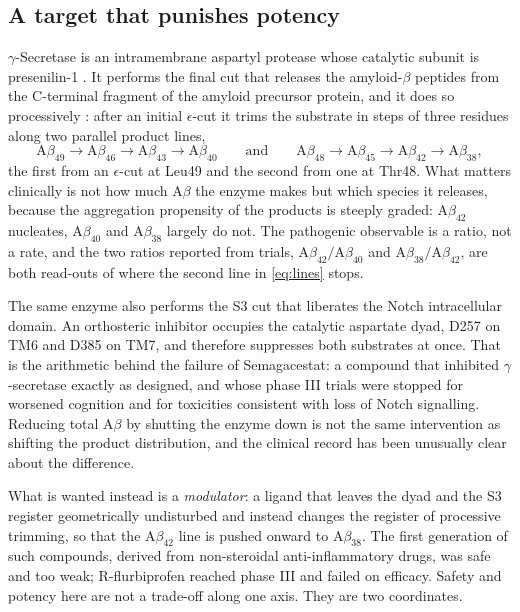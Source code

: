 \documentclass[11pt,reqno]{amsart}
\theoremstyle{plain}
\theoremstyle{definition}
\theoremstyle{remark}
\numberwithin{equation}{section}
\newcommand{\Ab}{\mathrm{A}\beta}
\begin{document}
\subsection{A target that punishes potency}
$\gamma$-Secretase is an intramembrane aspartyl protease whose catalytic subunit is presenilin-1 \cite{Wolfe1999}. It performs the final cut that releases the amyloid-$\beta$ peptides from the C-terminal fragment of the amyloid precursor protein, and it does so processively \cite{Takami2009}: after an initial $\epsilon$-cut it trims the substrate in steps of three residues along two parallel product lines,
\begin{equation}
\label{eq:lines}
\Ab_{49}\to\Ab_{46}\to\Ab_{43}\to\Ab_{40}
\qquad\text{and}\qquad
\Ab_{48}\to\Ab_{45}\to\Ab_{42}\to\Ab_{38},
\end{equation}
the first from an $\epsilon$-cut at Leu49 and the second from one at Thr48. What matters clinically is not how much $\Ab$ the enzyme makes but which species it releases, because the aggregation propensity of the products is steeply graded: $\Ab_{42}$ nucleates, $\Ab_{40}$ and $\Ab_{38}$ largely do not. The pathogenic observable is a ratio, not a rate, and the two ratios reported from trials, $\Ab_{42}/\Ab_{40}$ and $\Ab_{38}/\Ab_{42}$, are both read-outs of where the second line in \eqref{eq:lines} stops.

The same enzyme also performs the S3 cut that liberates the Notch intracellular domain. An orthosteric inhibitor occupies the catalytic aspartate dyad, D257 on TM6 and D385 on TM7, and therefore suppresses both substrates at once. That is the arithmetic behind the failure of Semagacestat: a compound that inhibited $\gamma$-secretase exactly as designed, and whose phase III trials were stopped for worsened cognition and for toxicities consistent with loss of Notch signalling. Reducing total $\Ab$ by shutting the enzyme down is not the same intervention as shifting the product distribution, and the clinical record has been unusually clear about the difference.

What is wanted instead is a \emph{modulator}: a ligand that leaves the dyad and the S3 register geometrically undisturbed and instead changes the register of processive trimming, so that the $\Ab_{42}$ line is pushed onward to $\Ab_{38}$. The first generation of such compounds, derived from non-steroidal anti-inflammatory drugs, was safe and too weak; R-flurbiprofen reached phase III and failed on efficacy. Safety and potency here are not a trade-off along one axis. They are two coordinates.
\end{document}

